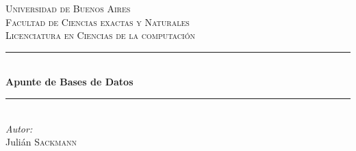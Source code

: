 \documentclass[]{article}
\begin{document}
\begin{titlepage}

\newcommand{\HRule}{\rule{\linewidth}{0.5mm}} %

\center %


\textsc{\LARGE Universidad de Buenos Aires}\\[1.5cm] %
\textsc{\Large Facultad de Ciencias exactas y Naturales}\\[0.5cm] %
\textsc{\large Licenciatura en Ciencias de la computación}\\[0.5cm] %


\HRule \\[0.4cm]
{ \huge \bfseries Apunte de Bases de Datos}\\[0.4cm] %
\HRule \\[1.5cm]

%

\Large \emph{Autor:}\\
Julián \textsc{Sackmann}\\[2cm] %


\end{titlepage}
\end{document}
